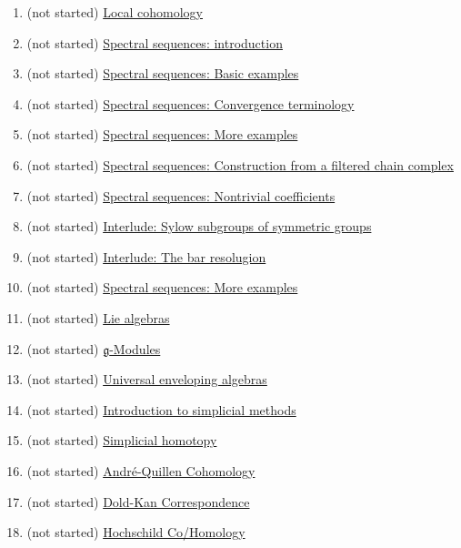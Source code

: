\documentclass{ximera}
\begin{document}
\begin{enumerate}
\item (not started)
  \href{/activity/localCohomology/localCohomology/}{Local cohomology}
\item (not started) \href{/activity/spectralSequencesIntroduction/spectralSequencesIntroduction/}{Spectral sequences: introduction}
\item (not started) \href{/activity/spectralSequencesBasicExamples/spectralSequencesBasicExamples/}{Spectral sequences: Basic examples}
\item (not started) \href{/activity/spectralSequencesConvergenceTerminology/spectralSequencesConvergenceTerminology/}{Spectral sequences: Convergence terminology}
\item (not started) \href{/activity/spectralSequencesMoreExamples/spectralSequencesMoreExamples/}{Spectral sequences: More examples}
\item (not started) \href{/activity/spectralSequencesConstructionFromAFilteredChainComplex/spectralSequencesConstructionFromAFilteredChainComplex/}{Spectral sequences: Construction from a filtered chain complex}
\item (not started) \href{/activity/spectralSequencesNontrivialCoefficients/spectralSequencesNontrivialCoefficients/}{Spectral sequences: Nontrivial coefficients}
\item (not started) \href{/activity/interludeSylowSubgroupsOfSymmetricGroups/interludeSylowSubgroupsOfSymmetricGroups/}{Interlude: Sylow subgroups of symmetric groups}
\item (not started) \href{/activity/interludeTheBarResolugion/interludeTheBarResolugion/}{Interlude: The bar resolugion}
\item (not started) \href{/activity/spectralSequencesMoreExamples/spectralSequencesMoreExamples/}{Spectral sequences: More examples}
\item (not started) \href{/activity/lieAlgebras/lieAlgebras/}{Lie algebras}
\item (not started) \href{/activity/gModules/gModules/}{$\mathfrak{g}$-Modules}
\item (not started) \href{/activity/universalEnvelopingAlgebras/universalEnvelopingAlgebras/}{Universal enveloping algebras}
\item (not started) \href{/activity/introductionToSimplicialMethods/introductionToSimplicialMethods/}{Introduction to simplicial methods}
\item (not started) \href{/activity/simplicialHomotopy/simplicialHomotopy/}{Simplicial homotopy}
\item (not started) \href{/activity/andreQuillenCohomology/andreQuillenCohomology/}{André-Quillen Cohomology}
\item (not started) \href{/activity/doldKanCorrespondence/doldKanCorrespondence/}{Dold-Kan Correspondence}
\item (not started) \href{/activity/hochschildCoHomology/hochschildCoHomology/}{Hochschild Co/Homology}

\end{enumerate}
\end{document}
